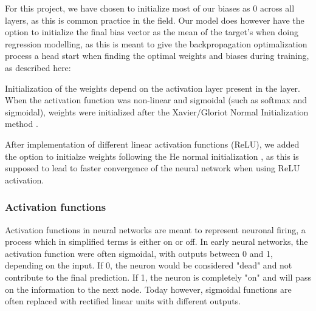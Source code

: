 For this project, we have chosen to initialize most of our biases as 0 across all layers, as this is common 
practice in the field. Our model does however have the option to initialize the final bias vector as the mean 
of the target's when doing regression modelling, as this is meant to give the backpropagation optimalization 
process a head start when finding the optimal weights and biases during training, as described here: \cite{best_bias}

Initialization of the weights depend on the activation layer present in the layer. When the activation 
function was non-linear and sigmoidal (such as softmax and sigmoidal), weights were initialized after
the Xavier/Gloriot Normal Initialization method \cite{xaviergloriot}. 

After implementation of different linear activation functions (ReLU), we added the option to initialze
weights following the He normal initialization \cite{heman}, as this is supposed to 
lead to faster convergence of the neural network when using ReLU activation. 

\subsubsection{Activation functions}\label{sssec:activation_functions}

Activation functions in neural networks are meant to represent neuronal firing, a process which in simplified terms is either on or off. In early neural networks, the activation function were often sigmoidal, with outputs between 0 and 1, depending on the input. If 0, the neuron would be considered "dead" and not contribute to the final prediction. If 1, the neuron is completely "on" and will pass on the information to the next node. Today however, sigmoidal functions are often replaced with rectified linear units with different outputs. 

